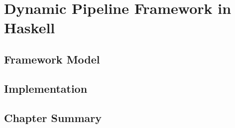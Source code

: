 \chapter{Dynamic Pipeline Framework in Haskell}
\section{Framework Model}
\section{Implementation}
\section{Chapter Summary}

